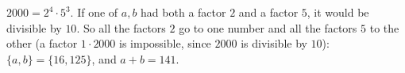 $2000=2^4\cdot5^3$. If one of $a,b$ had both a factor $2$ and a factor $5$, it would be divisible by $10$. So all the factors $2$ go to one number and all the factors $5$ to the other (a factor $1\cdot2000$ is impossible, since $2000$ is divisible by $10$): $\{a,b\}=\{16,125\}$, and $a+b=\boxed{141}$.
